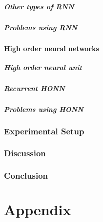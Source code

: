 \documentclass[a4paper, twoside]{article}
\begin{document}
\subsubsection{Other types of RNN}
\label{ssub:other_types_of_rnn}

\subsubsection{Problems using RNN}
\label{ssub:problems_using_rnn}


\subsection{High order neural networks}
\label{sub:high_order_neural_networks}

\subsubsection{High order neural unit}
\label{ssub:high_order_neural_unit}

\subsubsection{Recurrent HONN}
\label{ssub:recurrent_honn}

\subsubsection{Problems using HONN}
\label{ssub:problems_using_honn}


\section{Experimental Setup}
\label{sec:experimental_setup}


\section{Discussion}
\label{sec:discussion}

\section{Conclusion}
\label{sec:conclusion}



\newpage
\nocite{*}
\printbibliography
\newpage

\appendix
\part*{Appendix}
\end{document}

